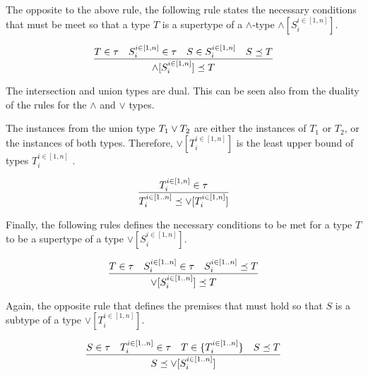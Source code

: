 \documentclass[runningheads]{llncs}
\newcommand{\I}{{\cal I}}
\newcommand{\T}{{\cal T}}
\newcommand{\memo}[1]{}
\begin{document}
The opposite to the above rule, the following rule states the
necessary conditions that must be meet so that a type $T$ is a
supertype of a $\land$-type $\land[S_i^{i\in[1,n]}]$.

\begin{equation}
\label{rul:land-succeq}
\dfrac{T\in\tau\quad\/S_i^{i\in[1,n]}\in\tau\quad\/S\in{S_i^{i\in[1,n]}}\quad\/S\preceq\/T}
      {\land[S_i^{i\in[1,n]}]\preceq\/T}  
\end{equation} 

The intersection and union types are dual. This can be seen also from
the duality of the rules for the $\land$ and $\lor$ types.

The instances from the union type $T_1\lor\/T_2$ are either the
instances of $T_1$ or $T_2$, or the instances of both
types. Therefore, $\lor[T_i^{i\in[1,n]}]$ is the least upper bound of
types $T_i^{i\in[1,n]}$ \cite{Pierce1991}.

\begin{equation}
\label{rul:lor-1}
\dfrac{T_i^{i\in[1,n]}\in\tau}
      {T_i^{i\in[1..n]}\preceq\/\lor[T_i^{i\in[1,n]}]}
\end{equation}

Finally, the following rules defines the necessary conditions to be
met for a type $T$ to be a supertype of a type
$\lor[S_i^{i\in[1,n]}]$.

\begin{equation}
\label{rul:lor-succeq}
\dfrac{T\in\tau\quad\/S_i^{i\in[1..n]}\in\tau\quad\/S_i^{i\in[1..n]}\preceq\/T}
      {\lor[S_i^{i\in[1..n]}]\preceq\/T}  
\end{equation}

Again, the opposite rule that defines the premises that must hold so
that $S$ is a subtype of a type $\lor[T_i^{i\in[1,n]}]$.

\begin{equation}
\label{rul:lor-preceq}
\dfrac{S\in\tau\quad\/T_i^{i\in[1..n]}\in\tau\quad\/T\in\{T_i^{i\in[1..n]}\}\quad\/S\preceq\/T}
      {S\preceq\lor[S_i^{i\in[1..n]}]}  
\end{equation}


\memo{
Note that the interpretation of a class $C$ is a set of instances
$\llbracket\/C\rrbracket_\D=\{I\ |\ I\in\I_i\land\/I:C\}$. Further, the
interpretation of a triple type $T$ is the set of ground triples
$\llbracket\/T\rrbracket_\D=\{t\ |\ t\in\T_t\land\/t:T\}$\footnote{Triple
  types $\T_t$ are presented in the following Section
  \ref{sec:triples}.}\cite{Savnik2025}.\\}
\end{document}

